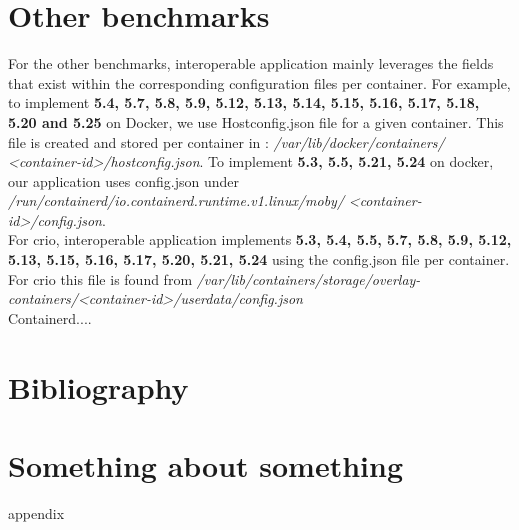\documentclass[times, twoside, watermark]{zHenriquesLab-StyleBioRxiv}
\begin{document}
\section*{Other benchmarks}
For the other benchmarks, interoperable application mainly leverages the fields that exist within the corresponding configuration files per container. For example,
to implement \textbf{5.4, 5.7, 5.8, 5.9, 5.12, 5.13, 5.14, 5.15, 5.16, 5.17, 5.18, 5.20 and 5.25} on Docker, we use Hostconfig.json file for a given container. This file
is created and stored per container in : \textit{/var/lib/docker/containers/} \textit{<container-id>/hostconfig.json}. To implement \textbf{5.3, 5.5, 5.21, 5.24} on docker, our application uses config.json under \textit{/run/containerd/io.containerd.runtime.v1.linux/moby/} \textit{<container-id>/config.json}.
\\
For crio, interoperable application implements \textbf{5.3, 5.4, 5.5, 5.7, 5.8, 5.9, 5.12, 5.13, 5.15, 5.16, 5.17, 5.20, 5.21, 5.24} using the config.json file per container. For crio this file is found from \textit{/var/lib/containers/storage/overlay-containers/}\textit{<container-id>/userdata/config.json}
\\

Containerd....

\section*{Bibliography}

\onecolumn
\newpage

\captionsetup*{format=largeformat}
\section{Something about something} \label{note:Note1} 
appendix

\end{document}
